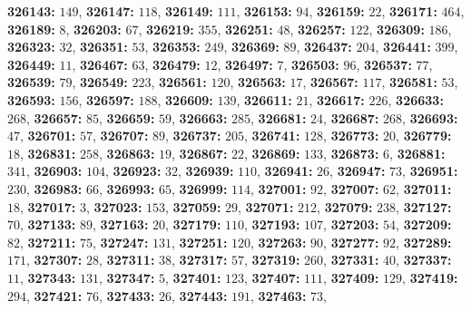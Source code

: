 \textsf{\bfseries 326143:} $149$, \textsf{\bfseries 326147:} $118$, \textsf{\bfseries 326149:} $111$, \textsf{\bfseries 326153:} $94$, \textsf{\bfseries 326159:} $22$, \textsf{\bfseries 326171:} $464$, \textsf{\bfseries 326189:} $8$, \textsf{\bfseries 326203:} $67$, \textsf{\bfseries 326219:} $355$, \textsf{\bfseries 326251:} $48$, \textsf{\bfseries 326257:} $122$, \textsf{\bfseries 326309:} $186$, \textsf{\bfseries 326323:} $32$, \textsf{\bfseries 326351:} $53$, \textsf{\bfseries 326353:} $249$, \textsf{\bfseries 326369:} $89$, \textsf{\bfseries 326437:} $204$, \textsf{\bfseries 326441:} $399$, \textsf{\bfseries 326449:} $11$, \textsf{\bfseries 326467:} $63$, \textsf{\bfseries 326479:} $12$, \textsf{\bfseries 326497:} $7$, \textsf{\bfseries 326503:} $96$, \textsf{\bfseries 326537:} $77$, \textsf{\bfseries 326539:} $79$, \textsf{\bfseries 326549:} $223$, \textsf{\bfseries 326561:} $120$, \textsf{\bfseries 326563:} $17$, \textsf{\bfseries 326567:} $117$, \textsf{\bfseries 326581:} $53$, \textsf{\bfseries 326593:} $156$, \textsf{\bfseries 326597:} $188$, \textsf{\bfseries 326609:} $139$, \textsf{\bfseries 326611:} $21$, \textsf{\bfseries 326617:} $226$, \textsf{\bfseries 326633:} $268$, \textsf{\bfseries 326657:} $85$, \textsf{\bfseries 326659:} $59$, \textsf{\bfseries 326663:} $285$, \textsf{\bfseries 326681:} $24$, \textsf{\bfseries 326687:} $268$, \textsf{\bfseries 326693:} $47$, \textsf{\bfseries 326701:} $57$, \textsf{\bfseries 326707:} $89$, \textsf{\bfseries 326737:} $205$, \textsf{\bfseries 326741:} $128$, \textsf{\bfseries 326773:} $20$, \textsf{\bfseries 326779:} $18$, \textsf{\bfseries 326831:} $258$, \textsf{\bfseries 326863:} $19$, \textsf{\bfseries 326867:} $22$, \textsf{\bfseries 326869:} $133$, \textsf{\bfseries 326873:} $6$, \textsf{\bfseries 326881:} $341$, \textsf{\bfseries 326903:} $104$, \textsf{\bfseries 326923:} $32$, \textsf{\bfseries 326939:} $110$, \textsf{\bfseries 326941:} $26$, \textsf{\bfseries 326947:} $73$, \textsf{\bfseries 326951:} $230$, \textsf{\bfseries 326983:} $66$, \textsf{\bfseries 326993:} $65$, \textsf{\bfseries 326999:} $114$, \textsf{\bfseries 327001:} $92$, \textsf{\bfseries 327007:} $62$, \textsf{\bfseries 327011:} $18$, \textsf{\bfseries 327017:} $3$, \textsf{\bfseries 327023:} $153$, \textsf{\bfseries 327059:} $29$, \textsf{\bfseries 327071:} $212$, \textsf{\bfseries 327079:} $238$, \textsf{\bfseries 327127:} $70$, \textsf{\bfseries 327133:} $89$, \textsf{\bfseries 327163:} $20$, \textsf{\bfseries 327179:} $110$, \textsf{\bfseries 327193:} $107$, \textsf{\bfseries 327203:} $54$, \textsf{\bfseries 327209:} $82$, \textsf{\bfseries 327211:} $75$, \textsf{\bfseries 327247:} $131$, \textsf{\bfseries 327251:} $120$, \textsf{\bfseries 327263:} $90$, \textsf{\bfseries 327277:} $92$, \textsf{\bfseries 327289:} $171$, \textsf{\bfseries 327307:} $28$, \textsf{\bfseries 327311:} $38$, \textsf{\bfseries 327317:} $57$, \textsf{\bfseries 327319:} $260$, \textsf{\bfseries 327331:} $40$, \textsf{\bfseries 327337:} $11$, \textsf{\bfseries 327343:} $131$, \textsf{\bfseries 327347:} $5$, \textsf{\bfseries 327401:} $123$, \textsf{\bfseries 327407:} $111$, \textsf{\bfseries 327409:} $129$, \textsf{\bfseries 327419:} $294$, \textsf{\bfseries 327421:} $76$, \textsf{\bfseries 327433:} $26$, \textsf{\bfseries 327443:} $191$, \textsf{\bfseries 327463:} $73$, 
